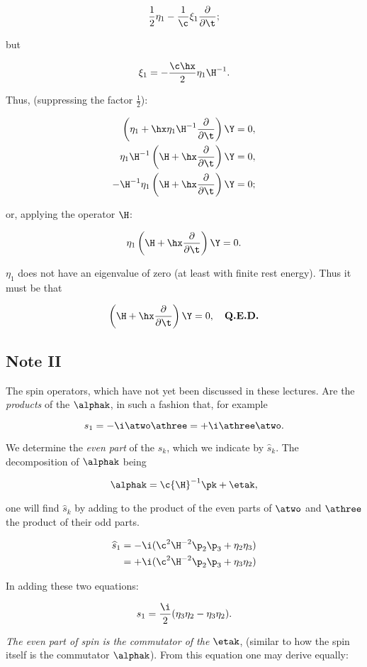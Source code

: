\documentclass{article}
\newcommand{\nc}[2]{
  \newcommand{#1}{#2}
}
\newcommand{\uequ}[1]{
\begin{equation*}
#1
\end{equation*}
}
\newcommand{\var}[1]{#1}
\newcommand{\inv}[1]{\frac{1}{#1}}
\newcommand{\opinv}[1]{{#1}^{-1}}
\newcommand{\oppddX}[1]{
\frac{\partial}{\partial{#1}}
}
\newcommand{\hatted}[1]{\widehat{#1}}
\renewcommand{\it}[1]{\textit{#1}}
\newcommand{\xiX}[1]{\var{\xi}_{#1}}
\newcommand{\etaX}[1]{\var{\eta}_{#1}}
\begin{document}
\nc{\oppddt}{\oppddX{\t}}

\uequ{
\inv{2}\etaX{1} - \inv{\c}\xiX{1}\oppddt;
}
but
\uequ{
\xiX{1} = -\frac{\c\hx}{2}\etaX{1}\opinv{\H}.
}

Thus, (suppressing the factor $\inv{2}$):
\uequ{
\begin{split}
\left(\etaX{1} + \hx\etaX{1}\opinv{\H}\oppddt\right)\Y &= 0,\\
\etaX{1}\opinv{\H}\left(\H + \hx\oppddt\right)\Y &= 0,\\
-\opinv{\H}\etaX{1}\left(\H + \hx\oppddt\right)\Y &= 0;
\end{split}
}
or, applying the operator $\H$:
\uequ{
\etaX{1}\left(
\H + \hx\oppddt
\right)\Y = 0.
}

$\etaX{1}$ does not have an eigenvalue of zero (at least with finite rest energy). Thus it must be that
\uequ{
\left(
\H + \hx\oppddt
\right)\Y = 0, \quad \textbf{Q.E.D.}
}

\subsection{Note II}

The spin operators, which have not yet been discussed in these lectures. Are the \it{products} of the $\alphak$, in such a fashion that, for example

\nc{\opSpin}{\var{s}_1}
\nc{\opSpinHat}{\hatted{\var{s}}_1}
\nc{\opSpink}{\var{s}_k}
\nc{\opSpinkHat}{\hatted{\var{s}}_k}

\uequ{
\opSpin = -\i\atwo\athree = +\i\athree\atwo.
}

We determine the \it{even part} of the $\opSpink$, which we indicate by $\opSpinkHat$. The decomposition of $\alphak$ being
\uequ{
\alphak = \c\opinv{\H}\pk + \etak,
}
one will find $\opSpinkHat$ by adding to the product of the even parts of $\atwo$ and $\athree$ the product of their odd parts.
\uequ{
\begin{split}
\opSpinHat &= -\i(\c^2\H^{-2}\p_2\p_3 + \etaX{2}\etaX{3}) \\
           &= +\i(\c^2\H^{-2}\p_2\p_3 + \etaX{3}\etaX{2})
\end{split}
}

In adding these two equations:
\uequ{
\opSpin = \frac{\i}{2}(\etaX{3}\etaX{2} - \etaX{3}\etaX{2}).
}

\it{The even part of spin is the commutator of the $\etak$}, (similar to how the spin itself is the commutator $\alphak$). From this equation one may derive equally:
\end{document}
